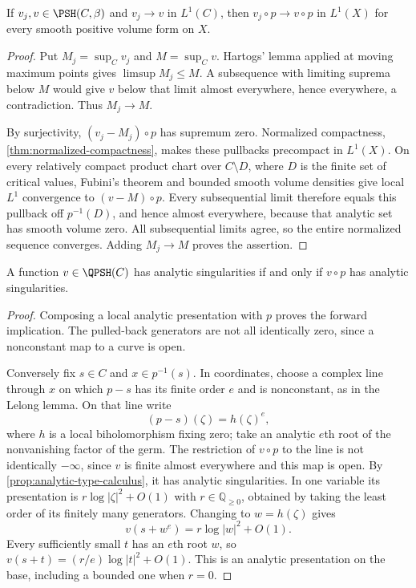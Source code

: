 \begin{lemma}\label{curve-map:lone-pullback}
If $v_j,v\in\PSH(C,\beta)$ and $v_j\to v$ in $L^1(C)$, then
$v_j\circ p\to v\circ p$ in $L^1(X)$ for every smooth positive
volume form on $X$.
\end{lemma}
\begin{proof}
Put $M_j=\sup_Cv_j$ and $M=\sup_Cv$. Hartogs' lemma applied at
moving maximum points gives $\limsup M_j\leq M$. A subsequence
with limiting suprema below $M$ would give $v$ below that limit
almost everywhere, hence everywhere, a contradiction. Thus
$M_j\to M$.

By surjectivity, $(v_j-M_j)\circ p$ has supremum zero. Normalized
compactness, \cref{thm:normalized-compactness}, makes these
pullbacks precompact in $L^1(X)$. On every relatively compact
product chart over $C\setminus D$, where $D$ is the finite set
of critical values, Fubini's theorem and bounded smooth volume
densities give local $L^1$ convergence to $(v-M)\circ p$.
Every subsequential limit therefore equals this pullback off
$p^{-1}(D)$, and hence almost everywhere, because that analytic
set has smooth volume zero. All subsequential limits agree,
so the entire normalized sequence converges. Adding $M_j\to M$
proves the assertion.
\end{proof}

\begin{lemma}\label{curve-map:analytic-types}
A function $v\in\QPSH(C)$ has analytic singularities if and
only if $v\circ p$ has analytic singularities.
\end{lemma}
\begin{proof}
Composing a local analytic presentation with $p$ proves the
forward implication. The pulled-back generators are not all
identically zero, since a nonconstant map to a curve is open.

Conversely fix $s\in C$ and $x\in p^{-1}(s)$. In coordinates,
choose a complex line through $x$ on which $p-s$ has its finite
order $e$ and is nonconstant, as in the Lelong lemma. On that
line write
\[
 (p-s)(\zeta)=h(\zeta)^e,
\]
where $h$ is a local biholomorphism fixing zero; take an analytic
$e$th root of the nonvanishing factor of the germ. The restriction
of $v\circ p$ to the line is not identically $-\infty$, since
$v$ is finite almost everywhere and this map is open. By
\cref{prop:analytic-type-calculus}, it has analytic singularities.
In one variable its presentation is
$r\log|\zeta|^2+O(1)$ with $r\in\mathbb Q_{\geq0}$, obtained by
taking the least order of its finitely many generators.
Changing to $w=h(\zeta)$ gives
\[
 v(s+w^e)=r\log|w|^2+O(1).
\]
Every sufficiently small $t$ has an $e$th root $w$, so
$v(s+t)=(r/e)\log|t|^2+O(1)$. This is an analytic presentation
on the base, including a bounded one when $r=0$.
\end{proof}

